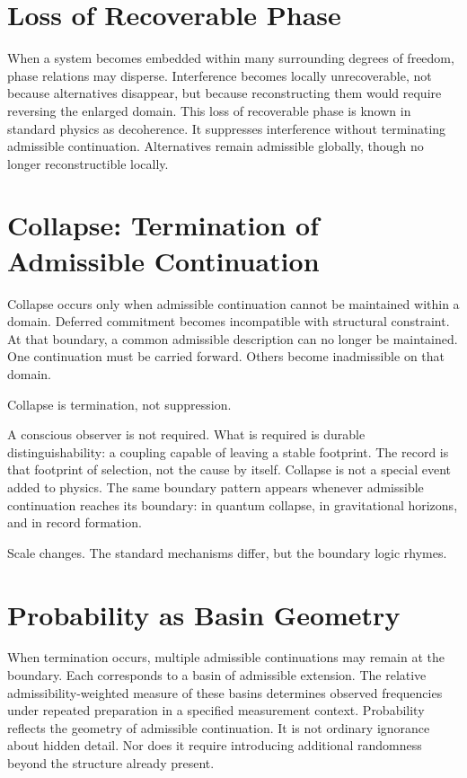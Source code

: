 \documentclass[11pt,twoside,openright]{book}
\begin{document}
\section*{Loss of Recoverable Phase}

When a system becomes embedded within many surrounding degrees of freedom, phase relations may disperse. Interference becomes locally unrecoverable, not because alternatives disappear, but because reconstructing them would require reversing the enlarged domain. This loss of recoverable phase is known in standard physics as decoherence. It suppresses interference without terminating admissible continuation. Alternatives remain admissible globally, though no longer reconstructible locally.

\section*{Collapse: Termination of Admissible Continuation}

Collapse occurs only when admissible continuation cannot be maintained within a domain. Deferred commitment becomes incompatible with structural constraint. At that boundary, a common admissible description can no longer be maintained. One continuation must be carried forward. Others become inadmissible on that domain.

Collapse is termination, not suppression.

A conscious observer is not required. What is required is durable distinguishability: a coupling capable of leaving a stable footprint. The record is that footprint of selection, not the cause by itself. Collapse is not a special event added to physics. The same boundary pattern appears whenever admissible continuation reaches its boundary: in quantum collapse, in gravitational horizons, and in record formation.

Scale changes. The standard mechanisms differ, but the boundary logic rhymes.

\section*{Probability as Basin Geometry}

When termination occurs, multiple admissible continuations may remain at the boundary. Each corresponds to a basin of admissible extension. The relative admissibility-weighted measure of these basins determines observed frequencies under repeated preparation in a specified measurement context. Probability reflects the geometry of admissible continuation. It is not ordinary ignorance about hidden detail. Nor does it require introducing additional randomness beyond the structure already present.
\end{document}
